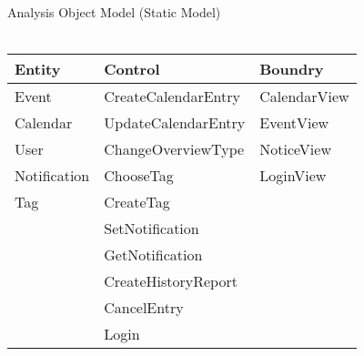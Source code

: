\documentclass{article}
\begin{document}
Analysis Object Model (Static Model)\\
\\
\begin{tabular}{l | l | l}

Entity    	& Control 			& Boundry 		\\
\toprule
Event     	& CreateCalendarEntry	& CalendarView	\\
Calendar	& UpdateCalendarEntry	& EventView 		\\
User		& ChangeOverviewType	& NoticeView		\\
Notification	& ChooseTag			& LoginView		\\
Tag		& CreateTag			&			\\
		& SetNotification		&			\\
		& GetNotification		&			\\		
		& CreateHistoryReport	&			\\
		& CancelEntry		&			\\
		& Login			&			\\		
		
\bottomrule
\end{tabular}
\end{document}
